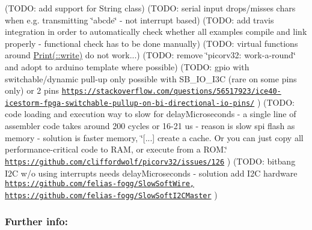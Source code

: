 (T\-O\-D\-O\-: add support for String class) (T\-O\-D\-O\-: serial input drops/misses chars when e.\-g. transmitting \char`\"{}abcde\char`\"{} -\/ not interrupt based) (T\-O\-D\-O\-: add travis integration in order to automatically check whether all examples compile and link properly -\/ functional check has to be done manually) (T\-O\-D\-O\-: virtual functions around \hyperlink{classPrint}{Print(\-::write)} do not work...) (T\-O\-D\-O\-: remove \char`\"{}picorv32\-: work-\/a-\/round\char`\"{} and adopt to arduino template where possible) (T\-O\-D\-O\-: gpio with switchable/dynamic pull-\/up only possible with S\-B\-\_\-\-I\-O\-\_\-\-I3\-C (rare on some pins only) or 2 pins \href{https://stackoverflow.com/questions/56517923/ice40-icestorm-fpga-switchable-pullup-on-bi-directional-io-pins/}{\tt https\-://stackoverflow.\-com/questions/56517923/ice40-\/icestorm-\/fpga-\/switchable-\/pullup-\/on-\/bi-\/directional-\/io-\/pins/} ) (T\-O\-D\-O\-: code loading and execution way to slow for delay\-Microseconds -\/ a single line of assembler code takes around 200 cycles or 16-\/21 us -\/ reason is slow spi flash as memory -\/ solution is faster memory, \char`\"{}\mbox{[}...\mbox{]} create a cache. Or you can just copy all performance-\/critical code to 
          R\-A\-M, or execute from a R\-O\-M.\char`\"{} \href{https://github.com/cliffordwolf/picorv32/issues/126}{\tt https\-://github.\-com/cliffordwolf/picorv32/issues/126} ) (T\-O\-D\-O\-: bitbang I2\-C w/o using interrupts needs delay\-Microseconds -\/ solution add I2\-C hardware \href{https://github.com/felias-fogg/SlowSoftWire,}{\tt https\-://github.\-com/felias-\/fogg/\-Slow\-Soft\-Wire,} \href{https://github.com/felias-fogg/SlowSoftI2CMaster}{\tt https\-://github.\-com/felias-\/fogg/\-Slow\-Soft\-I2\-C\-Master} )

\subsubsection*{Further info\-:}



